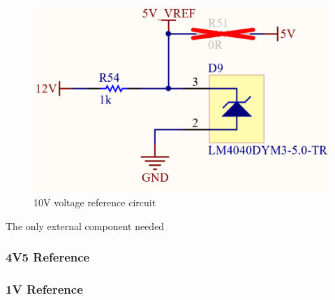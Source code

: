 			\begin{figure}[htbp]
				\centering
					\includegraphics[scale=0.4]{figuras/fig-LM4040DYM3-5.0-TR-circuit.png}
				\caption{10V voltage reference circuit \cite{LM4040DYM3-5.0-TR-circuit}}
				\label{fig:LM4040DYM3-5.0-TR-circuit}
			\end{figure}

			The only external component needed

		\subsubsection{4V5 Reference}\label{sssec:4v5-reference}
		\subsubsection{1V Reference}\label{sssec:1v-reference}